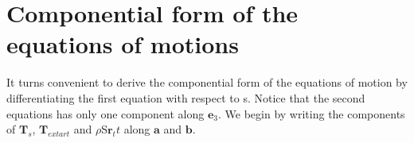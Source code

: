 

\section{Componential form of the equations of motions}\label{componential-form-of-the-equations-of-motion}
It turns convenient to derive the componential form of the equations of motion by differentiating the first equation with respect to s.
Notice that the second equations has only one component along $\mathbf{e}_3$.
We begin by writing the components of $\mathbf{T}_s$, $\mathbf{T}_{extart}$ and $\rho$S$\mathbf{r}_tt$ along $\mathbf{a}$ and $\mathbf{b}$.

 
 
 
 
 
 
  
  
  
  
  